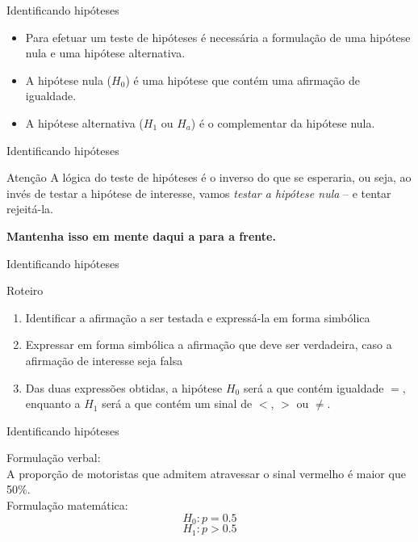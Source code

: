 \documentclass{beamer}
\begin{document}
\begin{frame}{Identificando hipóteses}
  \begin{itemize}
  \item Para efetuar um teste de hipóteses é necessária a formulação
    de uma \alert{hipótese nula} e uma \alert{hipótese alternativa}.
  \item A hipótese nula ($H_0$) é uma hipótese que contém uma
    afirmação de igualdade.
  \item A hipótese alternativa ($H_1$ ou $H_a$) é o complementar da
    hipótese nula.
  \end{itemize}
\end{frame}

\begin{frame}{Identificando hipóteses}
  \begin{block}{Atenção}
    A lógica do teste de hipóteses é o \alert{inverso} do que se esperaria, ou seja, ao invés de testar a hipótese de interesse, vamos {\em testar a hipótese nula} -- e tentar rejeitá-la.

\bigskip
{\bf Mantenha isso em mente daqui a para a frente.}
  \end{block}
\end{frame}

\begin{frame}{Identificando hipóteses}
  \begin{block}{Roteiro}
    \begin{enumerate}
    \item Identificar a afirmação a ser testada e expressá-la em forma simbólica
    \item Expressar em forma simbólica a afirmação que deve ser
      verdadeira, caso a afirmação de interesse seja falsa
    \item Das duas expressões obtidas, a hipótese $H_0$ será a que
      contém igualdade $=$, enquanto a $H_1$ será a que contém um
      sinal de $<$, $>$ ou $\ne$.
    \end{enumerate}
  \end{block}
\end{frame}

\begin{frame}{Identificando hipóteses}
  \begin{example}
    Formulação verbal:\\
    A proporção de motoristas que admitem atravessar o sinal vermelho
    é maior que 50\%.\\
    \bigskip
    Formulação matemática:\\
    \begin{displaymath}
      H_0: p=0.5
    \end{displaymath}
    \begin{displaymath}
      H_1: p>0.5
    \end{displaymath}
  \end{example}
\end{frame}
\end{document}
